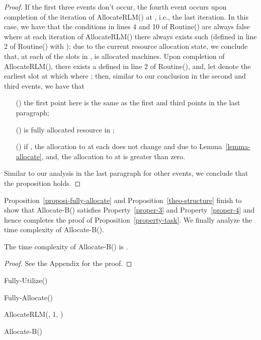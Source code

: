\documentclass[10pt,journal,compsoc]{IEEEtran}
\newcommand{\rmnum}[1]{\romannumeral #1}
\begin{document}
\begin{proof}
If the first three events don't occur, the fourth event occurs upon completion of the iteration of AllocateRLM() at , i.e., the last iteration. In this case, we have that the conditions in lines 4 and 10 of Routine() are always false where at each iteration of AllocateRLM() there always exists such  (defined in line 2 of Routine() with ); due to the current resource allocation state, we conclude that, at each of the slots in ,  is allocated  machines. Upon completion of AllocateRLM(), there exists a  defined in line 2 of Routine(), and, let  denote the earliest slot at which  where ; then, similar to our conclusion in the second and third events, we have that
\begin{enumerate}
 \setlength\itemsep{0.1em}
\item [(\rmnum{1})] the first point here is the same as the first and third points in the last paragraph;
\item [(\rmnum{2})]  is fully allocated  resource in ;

\item [(\rmnum{3})] if , the allocation to  at each  does not change and  due to Lemma~\ref{lemma-allocate}, and, the allocation to  at  is greater than zero.\end{enumerate}
Similar to our analysis in the last paragraph for other events, we conclude that the proposition holds.
\end{proof}





Proposition~\ref{proposi-fully-allocate} and Proposition~\ref{theo-structure} finish to show that Allocate-B() satisfies Property~\ref{proper-3} and Property~\ref{proper-4} and hence completes the proof of Proposition~\ref{property-task}. We finally analyze the time complexity of Allocate-B().


\begin{lemma}\label{lemma-complexity}
The time complexity of Allocate-B() is .
\end{lemma}
\begin{proof}
See the Appendix for the proof.
\end{proof}




\begin{algorithm}[!ht]

Fully-Utilize()\;

Fully-Allocate()\;

AllocateRLM(, 1, )\;

\caption{Allocate-B()\label{Allocate-B}}
\end{algorithm}
\end{document}
